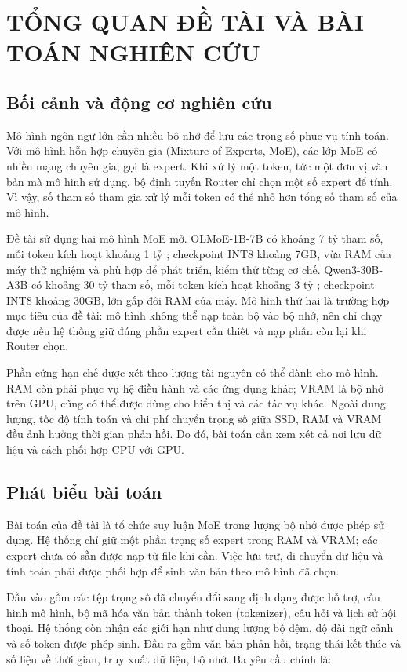 \chapter{TỔNG QUAN ĐỀ TÀI VÀ BÀI TOÁN NGHIÊN CỨU}


\section{Bối cảnh và động cơ nghiên cứu}

Mô hình ngôn ngữ lớn cần nhiều bộ nhớ để lưu các trọng số phục vụ tính toán. Với mô hình hỗn hợp chuyên gia (Mixture-of-Experts, MoE), các lớp MoE có nhiều mạng chuyên gia, gọi là expert. Khi xử lý một token, tức một đơn vị văn bản mà mô hình sử dụng, bộ định tuyến Router chỉ chọn một số expert để tính. Vì vậy, số tham số tham gia xử lý mỗi token có thể nhỏ hơn tổng số tham số của mô hình.

Đề tài sử dụng hai mô hình MoE mở. OLMoE-1B-7B có khoảng 7 tỷ tham số, mỗi token kích hoạt khoảng 1 tỷ \cite{olmoe}; checkpoint INT8 khoảng 7GB, vừa RAM của máy thử nghiệm và phù hợp để phát triển, kiểm thử từng cơ chế. Qwen3-30B-A3B có khoảng 30 tỷ tham số, mỗi token kích hoạt khoảng 3 tỷ \cite{qwen3}; checkpoint INT8 khoảng 30GB, lớn gấp đôi RAM của máy. Mô hình thứ hai là trường hợp mục tiêu của đề tài: mô hình không thể nạp toàn bộ vào bộ nhớ, nên chỉ chạy được nếu hệ thống giữ đúng phần expert cần thiết và nạp phần còn lại khi Router chọn.

Phần cứng hạn chế được xét theo lượng tài nguyên có thể dành cho mô hình. RAM còn phải phục vụ hệ điều hành và các ứng dụng khác; VRAM là bộ nhớ trên GPU, cũng có thể được dùng cho hiển thị và các tác vụ khác. Ngoài dung lượng, tốc độ tính toán và chi phí chuyển trọng số giữa SSD, RAM và VRAM đều ảnh hưởng thời gian phản hồi. Do đó, bài toán cần xem xét cả nơi lưu dữ liệu và cách phối hợp CPU với GPU.

\section{Phát biểu bài toán}

Bài toán của đề tài là tổ chức suy luận MoE trong lượng bộ nhớ được phép sử dụng. Hệ thống chỉ giữ một phần trọng số expert trong RAM và VRAM; các expert chưa có sẵn được nạp từ file khi cần. Việc lưu trữ, di chuyển dữ liệu và tính toán phải được phối hợp để sinh văn bản theo mô hình đã chọn.

Đầu vào gồm các tệp trọng số đã chuyển đổi sang định dạng được hỗ trợ, cấu hình mô hình, bộ mã hóa văn bản thành token (tokenizer), câu hỏi và lịch sử hội thoại. Hệ thống còn nhận các giới hạn như dung lượng bộ đệm, độ dài ngữ cảnh và số token được phép sinh. Đầu ra gồm văn bản phản hồi, trạng thái kết thúc và số liệu về thời gian, truy xuất dữ liệu, bộ nhớ. Ba yêu cầu chính là:

